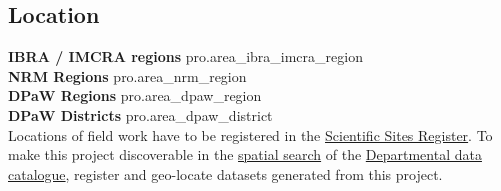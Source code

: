 \subsection*{Location}
\textbf{IBRA / IMCRA regions }{{ pro.area_ibra_imcra_region }}\\
\textbf{NRM Regions }{{ pro.area_nrm_region }}\\
\textbf{DPaW Regions }{{ pro.area_dpaw_region }}\\
\textbf{DPaW Districts }{{ pro.area_dpaw_district }}\\
Locations of field work have to be registered in the 
\href{http://scientificsites.dpaw.wa.gov.au/}{Scientific Sites Register}.
To make this project discoverable in the 
\href{http://internal-data.dpaw.wa.gov.au/dataset?ext_bbox=110\%2C-36\%2C130\%2C-9}{spatial search} of the
\href{http://internal-data.dpaw.wa.gov.au/}{Departmental data catalogue},
register and geo-locate datasets generated from this project.

